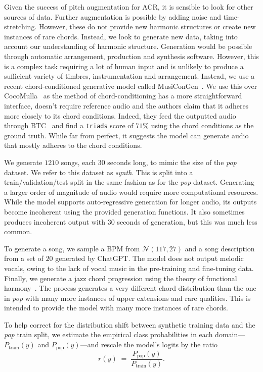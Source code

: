 Given the success of pitch augmentation for ACR, it is sensible to look for other sources of data. Further augmentation is possible by adding noise and time-stretching. However, these do not provide new harmonic structures or create new instances of rare chords. Instead, we look to generate new data, taking into account our understanding of harmonic structure. Generation would be possible through automatic arrangement, production and synthesis software. However, this is a complex task requiring a lot of human input and is unlikely to produce a sufficient variety of timbres, instrumentation and arrangement. Instead, we use a recent chord-conditioned generative model called MusiConGen~\cite{MusiConGen}. We use this over CocoMulla~\cite{CocoMulla} as the method of chord-conditioning has a more straightforward interface, doesn't require reference audio and the authors claim that it adheres more closely to its chord conditions. Indeed, they feed the outputted audio through BTC~\cite{BTC} and find a \texttt{triads} score of $71\%$ using the chord conditions as the ground truth. While far from perfect, it suggests the model can generate audio that mostly adheres to the chord conditions.

We generate $1210$ songs, each $30$ seconds long, to mimic the size of the \emph{pop} dataset. We refer to this dataset as \emph{synth}. This is split into a train/validation/test split in the same fashion as for the \emph{pop} dataset. Generating a larger order of magnitude of audio would require more computational resources. While the model supports auto-regressive generation for longer audio, its outputs become incoherent using the provided generation functions. It also sometimes produces incoherent output with $30$ seconds of generation, but this was much less common.

To generate a song, we sample a BPM from $\mathcal{N}(117, 27)$ and a song description from a set of $20$ generated by ChatGPT. The model does not output melodic vocals, owing to the lack of vocal music in the pre-training and fine-tuning data. Finally, we generate a jazz chord progression using the theory of functional harmony~\cite{GenerativeGrammarJazz}. The process generates a very different chord distribution than the one in \emph{pop} with many more instances of upper extensions and rare qualities. This is intended to provide the model with many more instances of rare chords.

To help correct for the distribution shift between synthetic training data and the \emph{pop} train split, we estimate the empirical class probabilities in each domain---\(P_{\text{train}}(y)\) and \(P_{\text{pop}}(y)\)---and rescale the model’s logits by the ratio
\begin{equation}
r(y)\;=\;\frac{P_{\text{pop}}(y)}{P_{\text{train}}(y)}.
\end{equation}

